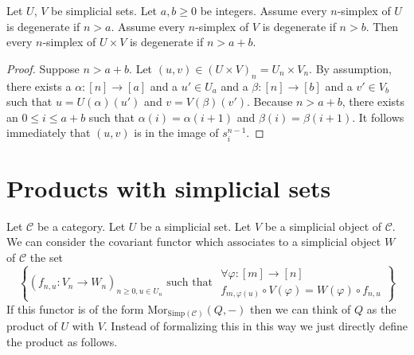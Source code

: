 \begin{lemma}
\label{lemma-product-degenerate}
Let $U$, $V$ be simplicial sets.
Let $a, b \geq 0$ be integers.
Assume every $n$-simplex of $U$ is degenerate if $n > a$.
Assume every $n$-simplex of $V$ is degenerate if $n > b$.
Then every $n$-simplex of $U \times V$ is degenerate
if $n > a + b$.
\end{lemma}

\begin{proof}
Suppose $n > a + b$. Let $(u,v) \in (U\times V)_n = U_n \times V_n$.
By assumption, there exists a $\alpha : [n] \to [a]$ and a
$u' \in U_a$ and a $\beta : [n] \to [b]$ and a $v' \in V_b$
such that $u = U(\alpha)(u')$ and $v = V(\beta)(v')$. Because
$n > a + b$, there exists an $0 \leq i \leq a + b$ such that
$\alpha(i) = \alpha(i + 1)$ and
$\beta(i) = \beta(i + 1)$. It follows immediately
that $(u,v)$ is in the image of $s^{n - 1}_i$.
\end{proof}



\section{Products with simplicial sets}
\label{section-product-with-simplicial-sets}

\noindent
Let $\mathcal{C}$ be a category.
Let $U$ be a simplicial set.
Let $V$ be a simplicial object of $\mathcal{C}$.
We can consider the covariant functor which associates
to a simplicial object $W$ of $\mathcal{C}$
the set
\begin{equation}
\label{equation-functor-product-with-simplicial-set}
\left\{
(f_{n, u} : V_n \to W_n)_{n \geq 0, u \in U_n}
\text{ such that }
\begin{matrix}
\forall \varphi : [m] \to [n] \\
f_{m, \varphi(u)} \circ V(\varphi) = W(\varphi) \circ f_{n, u}
\end{matrix}
\right\}
\end{equation}
If this functor is of the form
$\text{Mor}_{\text{Simp}(\mathcal{C})}(Q, -)$
then we can think of $Q$ as the product of $U$ with $V$.
Instead of formalizing this in this way we just directly
define the product as follows.

